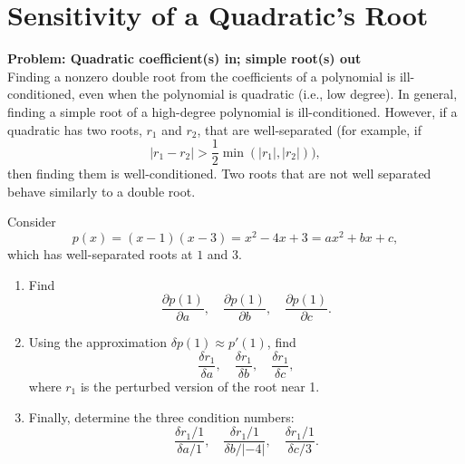 \documentclass[lang=cn,11pt]{elegantbook}
\begin{document}
\section{Sensitivity of a Quadratic's Root}
\textbf{Problem: Quadratic coefficient(s) in; simple root(s) out}\\[1mm]
Finding a nonzero double root from the coefficients of a polynomial is ill-conditioned, even when the polynomial is quadratic (i.e., low degree). In general, finding a simple root of a high-degree polynomial is ill-conditioned. However, if a quadratic has two roots, \(r_1\) and \(r_2\), that are well-separated (for example, if
\[
|r_1 - r_2| > \frac{1}{2}\min(|r_1|,|r_2|)),
\]
then finding them is well-conditioned. Two roots that are not well separated behave similarly to a double root.

Consider
\[
p(x)=(x-1)(x-3)=x^2-4x+3 = ax^2+bx+c,
\]
which has well-separated roots at \(1\) and \(3\).
\begin{enumerate}[label=(\alph*)]
    \item Find
    \[
    \frac{\partial p(1)}{\partial a}, \quad \frac{\partial p(1)}{\partial b}, \quad \frac{\partial p(1)}{\partial c}.
    \]
    \item Using the approximation \(\delta p(1) \approx p'(1)\), find
    \[
    \frac{\delta r_1}{\delta a}, \quad \frac{\delta r_1}{\delta b}, \quad \frac{\delta r_1}{\delta c},
    \]
    where \(r_1\) is the perturbed version of the root near 1.
    \item Finally, determine the three condition numbers:
    \[
    \frac{\delta r_1/1}{\delta a/1}, \quad \frac{\delta r_1/1}{\delta b/|{-4}|}, \quad \frac{\delta r_1/1}{\delta c/3}.
    \]
\end{enumerate}
\end{document}
